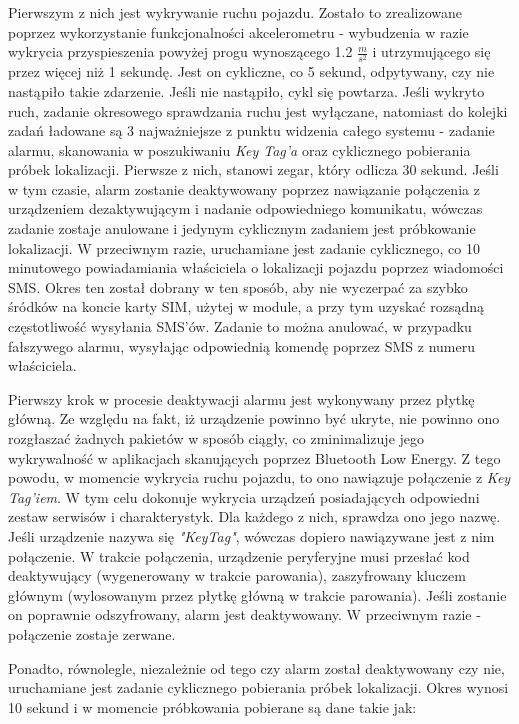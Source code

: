 Pierwszym z nich jest wykrywanie ruchu pojazdu. Zostało to zrealizowane poprzez wykorzystanie funkcjonalności akcelerometru - wybudzenia w razie wykrycia przyspieszenia powyżej progu wynoszącego 1.2 $\frac{m}{s^2}$ i utrzymującego się przez więcej niż 1 sekundę. Jest on cykliczne, co 5 sekund, odpytywany, czy nie nastąpiło takie zdarzenie. Jeśli nie nastąpiło, cykl się powtarza. Jeśli wykryto ruch, zadanie okresowego sprawdzania ruchu jest wyłączane, natomiast do kolejki zadań ładowane są 3 najważniejsze z punktu widzenia całego systemu - zadanie alarmu, skanowania w poszukiwaniu \textit{Key Tag'a} oraz cyklicznego pobierania próbek lokalizacji. Pierwsze z nich, stanowi zegar, który odlicza 30 sekund. Jeśli w tym czasie, alarm zostanie deaktywowany poprzez nawiązanie połączenia z urządzeniem dezaktywującym i nadanie odpowiedniego komunikatu, wówczas zadanie zostaje anulowane i jedynym cyklicznym zadaniem jest próbkowanie lokalizacji. W przeciwnym razie, uruchamiane jest zadanie cyklicznego, co 10 minutowego powiadamiania właściciela o lokalizacji pojazdu poprzez wiadomości SMS. Okres ten został dobrany w ten sposób, aby nie wyczerpać za szybko śródków na koncie karty SIM, użytej w module, a przy tym uzyskać rozsądną częstotliwość wysyłania SMS'ów. Zadanie to można anulować, w przypadku fałszywego alarmu, wysyłając odpowiednią komendę poprzez SMS z numeru właściciela. 

Pierwszy krok w procesie deaktywacji alarmu jest wykonywany przez płytkę główną. Ze względu na fakt, iż urządzenie powinno być ukryte, nie powinno ono rozgłaszać żadnych pakietów w sposób ciągły, co zminimalizuje jego wykrywalność w aplikacjach skanujących poprzez Bluetooth Low Energy. Z tego powodu, w momencie wykrycia ruchu pojazdu, to ono nawiązuje połączenie z \textit{Key Tag'iem}. W tym celu dokonuje wykrycia urządzeń posiadających odpowiedni zestaw serwisów i charakterystyk. Dla każdego z nich, sprawdza ono jego nazwę. Jeśli urządzenie nazywa się \textit{"KeyTag"}, wówczas dopiero nawiązywane jest z nim połączenie. W trakcie połączenia, urządzenie peryferyjne musi przesłać kod deaktywujący (wygenerowany w trakcie parowania), zaszyfrowany kluczem głównym (wylosowanym przez płytkę główną w trakcie parowania). Jeśli zostanie on poprawnie odszyfrowany, alarm jest deaktywowany. W przeciwnym razie - połączenie zostaje zerwane.

\clearpage 

Ponadto, równolegle, niezależnie od tego czy alarm został deaktywowany czy nie, uruchamiane jest zadanie cyklicznego pobierania próbek lokalizacji. Okres wynosi 10 sekund i w momencie próbkowania pobierane są dane takie jak:

